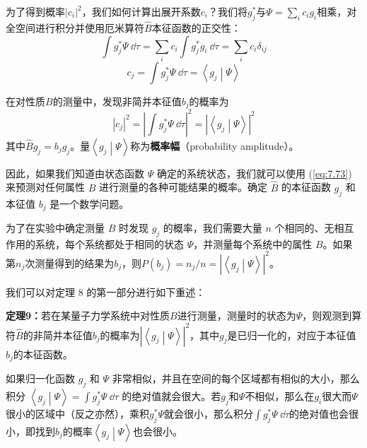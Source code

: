     为了得到概率$\left|c_i\right|^2$，我们如何计算出展开系数$c_i$？我们将$g_j^{\ast}$与$\Psi = \sum_{i}c_i g_i$相乘，对全空间进行积分并使用厄米算符$\hat{B}$本征函数的正交性：
    \begin{equation*}
        \int g_j^{\ast}\Psi \: \dd \tau = \sum_ic_i\int g_j^{\ast} g_i \: \dd \tau = \sum_i c_i\delta_{ij}
    \end{equation*}
    \begin{equation}
        c_j = \int g_j^{\ast}\Psi \: \dd \tau = \left\langle g_j \middle| \Psi \right\rangle
        \label{eq:7.72}
    \end{equation}

    在对性质$B$的测量中，发现非简并本征值$b_j$的概率为
    \begin{equation}
        \left|c_j\right|^2 = \left|\int g_j^{\ast}\Psi \: \dd \tau\right|^2 = \left|\left\langle g_j \middle| \Psi \right\rangle\right|^2
        \label{eq:7.73}
    \end{equation}
    其中$\hat{B}g_j = b_jg_j$。量$\left\langle g_j \middle| \Psi \right\rangle$称为\textbf{概率幅}（probability amplitude）。

    因此，如果我们知道由状态函数 $\Psi$ 确定的系统状态，我们就可以使用 (\ref{eq:7.73}) 来预测对任何属性 $B$ 进行测量的各种可能结果的概率。确定 $\hat{B}$ 的本征函数 $g_j$ 和本征值 $b_j$ 是一个数学问题。

    为了在实验中确定测量 $B$ 时发现 $g_j$ 的概率，我们需要大量 $n$ 个相同的、无相互作用的系统，每个系统都处于相同的状态 $\Psi$，并测量每个系统中的属性 $B$。如果第$n_j$次测量得到的结果为$b_j$，则$P\left(b_j\right) = n_j/n = \left|\left\langle g_j \middle| \Psi \right\rangle\right|^2$。

    我们可以对定理 8 的第一部分进行如下重述：
    \begin{center}
        \parbox{0.8\textwidth}{
            \textbf{定理9：}若在某量子力学系统中对性质$B$进行测量，测量时的状态为$\Psi$，则观测到算符$\hat{B}$的非简并本征值$b_j$的概率为$\left|\left\langle g_j \middle| \Psi \right\rangle\right|^2$，其中$g_j$是已归一化的，对应于本征值$b_j$的本征函数。
        }
    \end{center}

    如果归一化函数 $g_j$ 和 $\Psi$ 非常相似，并且在空间的每个区域都有相似的大小，那么积分 $\left\langle g_j \middle| \Psi \right\rangle = \int g_j^{\ast}\Psi\:\dd \tau$ 的绝对值就会很大。若$g_j$和$\Psi$不相似，那么在$g_i$很大而$\Psi$很小的区域中（反之亦然），乘积$g_j^{\ast}\Psi$就会很小，那么积分$\int g_j^{\ast}\Psi\:\dd \tau$的绝对值也会很小，即找到$b_j$的概率$\left\langle g_j \middle| \Psi \right\rangle$也会很小。

